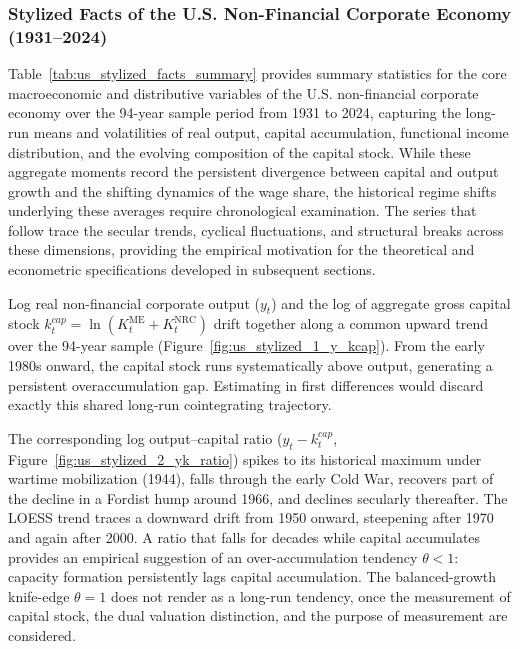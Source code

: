 \subsubsection{Stylized Facts of the U.S. Non-Financial Corporate Economy (1931--2024)}

Table~\ref{tab:us_stylized_facts_summary} provides summary statistics for the core macroeconomic and distributive variables of the U.S. non-financial corporate economy over the 94-year sample period from 1931 to 2024, capturing the long-run means and volatilities of real output, capital accumulation, functional income distribution, and the evolving composition of the capital stock. While these aggregate moments record the persistent divergence between capital and output growth and the shifting dynamics of the wage share, the historical regime shifts underlying these averages require chronological examination. The series that follow trace the secular trends, cyclical fluctuations, and structural breaks across these dimensions, providing the empirical motivation for the theoretical and econometric specifications developed in subsequent sections.



Log real non-financial corporate output ($y_t$) and the log of aggregate gross capital stock $k_t^{cap} = \ln(K_t^{\text{ME}} + K_t^{\text{NRC}})$ drift together along a common upward trend over the 94-year sample (Figure~\ref{fig:us_stylized_1_y_kcap}). From the early 1980s onward, the capital stock runs systematically above output, generating a persistent overaccumulation gap. Estimating in first differences would discard exactly this shared long-run cointegrating trajectory.

The corresponding log output--capital ratio ($y_t - k_t^{cap}$, Figure~\ref{fig:us_stylized_2_yk_ratio}) spikes to its historical maximum under wartime mobilization (1944), falls through the early Cold War, recovers part of the decline in a Fordist hump around 1966, and declines secularly thereafter. The LOESS trend traces a downward drift from 1950 onward, steepening after 1970 and again after 2000. A ratio that falls for decades while capital accumulates provides an empirical suggestion of an over-accumulation tendency $\theta < 1$: capacity formation persistently lags capital accumulation. The balanced-growth knife-edge $\theta = 1$ does not render as a long-run tendency, once the measurement of capital stock, the dual valuation distinction, and the purpose of measurement are considered. 

